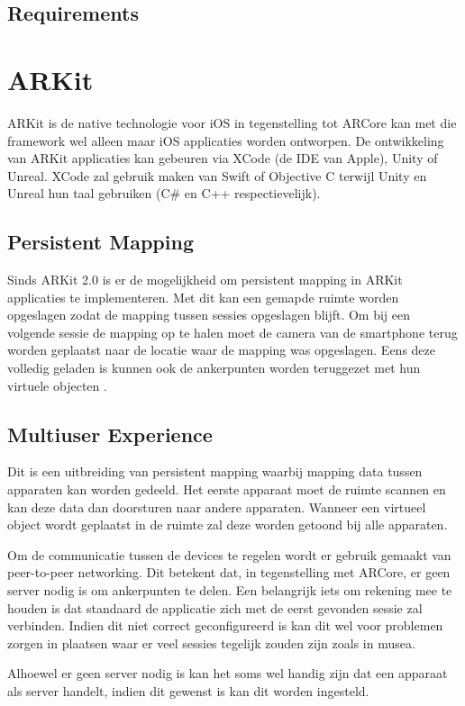 \subsection{Requirements}
\section{ARKit}
ARKit is de native technologie voor iOS in tegenstelling tot ARCore kan met die framework wel alleen maar iOS applicaties worden ontworpen. 
De ontwikkeling van ARKit applicaties kan gebeuren via XCode (de IDE van Apple), Unity of Unreal. XCode zal gebruik maken van Swift of Objective C terwijl Unity en Unreal hun taal gebruiken (C\# en C++ respectievelijk).

\subsection{Persistent Mapping}
Sinds ARKit 2.0 is er de mogelijkheid om persistent mapping in ARKit applicaties te implementeren. Met dit kan een gemapde ruimte worden opgeslagen zodat de mapping tussen sessies opgeslagen blijft.
Om bij een volgende sessie de mapping op te halen moet de camera van de smartphone terug worden geplaatst naar de locatie waar de mapping was opgeslagen. Eens deze volledig geladen is kunnen ook de ankerpunten worden teruggezet met hun virtuele objecten \autocite{ARKitPersistent}.

\subsection{Multiuser Experience}
Dit is een uitbreiding van persistent mapping waarbij mapping data tussen apparaten kan worden gedeeld. Het eerste apparaat moet de ruimte scannen en kan deze data dan doorsturen naar andere apparaten. Wanneer een virtueel object wordt geplaatst in de ruimte zal deze worden getoond bij alle apparaten.

Om de communicatie tussen de devices te regelen wordt er gebruik gemaakt van peer-to-peer networking. Dit betekent dat, in tegenstelling met ARCore, er geen server nodig is om ankerpunten te delen. Een belangrijk iets om rekening mee te houden is dat standaard de applicatie zich met de eerst gevonden sessie zal verbinden. Indien dit niet correct geconfigureerd is kan dit wel voor problemen zorgen in plaatsen waar er veel sessies tegelijk zouden zijn zoals in musea.

Alhoewel er geen server nodig is kan het soms wel handig zijn dat een apparaat als server handelt, indien dit gewenst is kan dit worden ingesteld.

